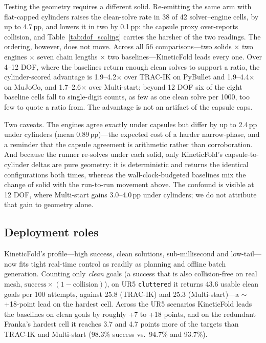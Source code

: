 \documentclass[10pt,conference]{IEEEtran}
\begin{document}
Testing the geometry requires a different solid. Re-emitting the same arm with
flat-capped cylinders raises the clean-solve rate in 38 of 42 solver--engine
cells, by up to 4.7\,pp, and lowers it in two by 0.1\,pp: the capsule proxy
over-reports collision, and Table~\ref{tab:dof_scaling} carries the harsher of
the two readings. The ordering, however, does not move. Across all 56
comparisons---two solids $\times$ two engines $\times$ seven chain lengths
$\times$ two baselines---KineticFold leads every one. Over 4--12 DOF, where the
baselines return enough clean solves to support a ratio, the cylinder-scored
advantage is 1.9--4.2$\times$ over TRAC-IK on PyBullet and 1.9--4.4$\times$ on
MuJoCo, and 1.7--2.6$\times$ over Multi-start; beyond 12 DOF six of the eight
baseline cells fall to single-digit counts, as few as one clean solve per 1000,
too few to quote a ratio from. The advantage is not an artifact of the capsule
caps.

Two caveats. The engines agree exactly under capsules but differ by up to
2.4\,pp under cylinders (mean 0.89\,pp)---the expected cost of a harder
narrow-phase, and a reminder that the capsule agreement is arithmetic rather than
corroboration. And because the runner re-solves under each solid, only
KineticFold's capsule-to-cylinder deltas are pure geometry: it is deterministic
and returns the identical configurations both times, whereas the
wall-clock-budgeted baselines mix the change of solid with the run-to-run
movement above. The confound is visible at 12 DOF, where Multi-start gains
3.0--4.0\,pp under cylinders; we do not attribute that gain to geometry alone.

\subsection{Deployment roles}
\label{sec:deployment}

KineticFold's profile---high success, clean solutions, sub-millisecond and
low-tail---now fits tight real-time control as readily as planning and offline
batch generation. Counting only \emph{clean} goals (a success that is also
collision-free on real mesh, $\mathrm{success} \times (1 - \mathrm{collision})$),
on UR5 \texttt{cluttered} it returns 43.6 usable clean goals per 100 attempts,
against 25.8 (TRAC-IK) and 25.3 (Multi-start)---a $\sim$+18-point lead on the
hardest cell. Across the UR5 scenarios KineticFold leads the baselines on clean
goals by roughly +7 to +18 points, and on the redundant Franka's hardest cell it
reaches 3.7 and 4.7 points more of the targets than TRAC-IK and Multi-start
(98.3\% success vs.\ 94.7\% and 93.7\%).
\end{document}
